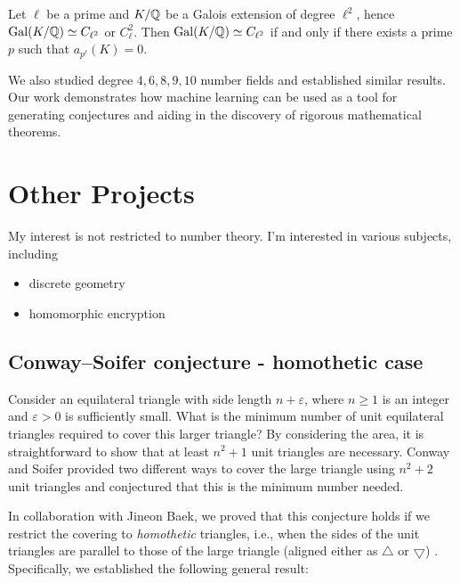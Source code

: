 \documentclass[letterpaper, 10pt]{article}
\begin{document}
\begin{theorem*}[Lee--L.]
\label{thm:ellsqzeta}
    Let $\ell$ be a prime and $K / \mathbb{Q}$ be a Galois extension of degree $\ell^2$, hence $\mathrm{Gal}(K/\mathbb{Q}) \simeq C_{\ell^2}$ or $C_{\ell}^2$.
    Then $\mathrm{Gal}(K / \mathbb{Q}) \simeq C_{\ell^2}$ if and only if there exists a prime $p$ such that $a_{p^\ell}(K) = 0$.
\end{theorem*}

We also studied degree \(4, 6, 8, 9, 10\) number fields and established similar results.
Our work demonstrates how machine learning can be used as a tool for generating conjectures and aiding in the discovery of rigorous mathematical theorems.



\section{Other Projects}

My interest is not restricted to number theory. I'm interested in various subjects, including
\begin{itemize}
    \item discrete geometry
    \item homomorphic encryption
\end{itemize}



\subsection{Conway--Soifer conjecture - homothetic case}

Consider an equilateral triangle with side length $n + \varepsilon$, where $n \ge 1$ is an integer and $\varepsilon > 0$ is sufficiently small.
What is the minimum number of unit equilateral triangles required to cover this larger triangle?
By considering the area, it is straightforward to show that at least $n^2 + 1$ unit triangles are necessary.
Conway and Soifer provided two different ways to cover the large triangle using $n^2 + 2$ unit triangles \cite{conway2005covering} and conjectured that this is the minimum number needed.

In collaboration with Jineon Baek, we proved that this conjecture holds if we restrict the covering to \emph{homothetic} triangles, i.e., when the sides of the unit triangles are parallel to those of the large triangle (aligned either as $\bigtriangleup$ or $\bigtriangledown$) \cite{baek2024equilateral}.
Specifically, we established the following general result:
\end{document}
